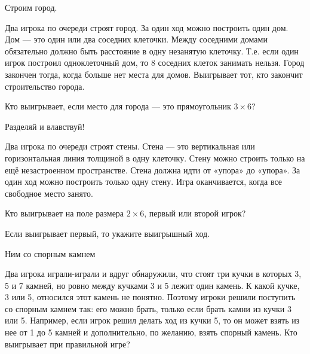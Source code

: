 \begin{problem}
Строим город.

Два игрока по очереди строят город. За один ход можно построить один дом. Дом — это один или два соседних клеточки. Между соседними домами обязательно должно быть расстояние в одну незанятую клеточку. Т.е. если один игрок построил одноклеточный дом, то 8 соседних клеток занимать нельзя. Город закончен тогда, когда больше нет места для домов. Выигрывает тот, кто закончит строительство города.

Кто выигрывает, если место для города — это прямоугольник $3\times 6$?



\begin{sol}

\end{sol}
\end{problem}




\begin{problem}
Разделяй и влавствуй!

Два игрока по очереди строят стены. Стена — это вертикальная или горизонтальная линия толщиной в одну клеточку. Стену можно строить только на ещё незастроенном пространстве. Стена должна идти от «упора» до «упора». За один ход можно построить только одну стену. Игра оканчивается, когда все свободное место занято.

Кто выигрывает на поле размера $2\times 6$, первый или второй игрок?

Если выигрывает первый, то укажите выигрышный ход.



\begin{sol}

\end{sol}
\end{problem}




\begin{problem}
Ним со спорным камнем

Два игрока играли-играли и вдруг обнаружили, что стоят три кучки в которых 3, 5 и 7 камней, но ровно между кучками 3 и 5 лежит один камень. К какой кучке, 3 или 5, относился этот камень не понятно. Поэтому игроки решили поступить со спорным камнем так: его можно брать, только если брать камни из кучки 3 или 5. Например, если игрок решил делать ход из кучки 5, то он может взять из нее от 1 до 5 камней и дополнительно, по желанию, взять спорный камень. Кто выигрывает при правильной игре?



\begin{sol}

\end{sol}
\end{problem}






